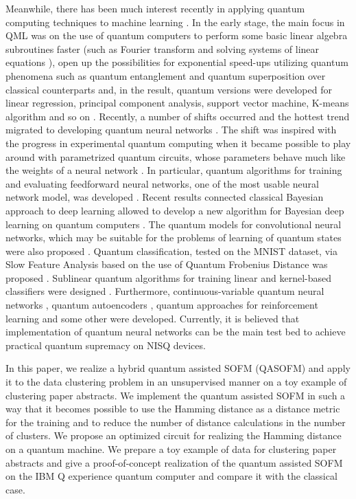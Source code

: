 \documentclass[pra,showkeys,twocolumn,showpacs]{revtex4-1}
\begin{document}
Meanwhile, there has been much interest recently in applying quantum computing techniques to machine learning \cite{dunjko2018, biamonte2017, schuld2014, carleo2019}. 
In the early stage, the main focus in QML was on the use of quantum computers to perform some basic linear algebra subroutines faster (such as Fourier transform and solving systems of linear equations \cite{wiebe2012,harrow2009,childs2017}), 
open up the possibilities for exponential speed-ups utilizing quantum phenomena such as quantum entanglement and quantum superposition over classical counterparts \cite{biamonte2017, schuld2014} and,
in the result, quantum versions were developed for linear regression, principal component analysis, support vector machine, K-means algorithm and so on \cite{lloyd2013,lloyd2014,dunjko2016,paparo2014,rebentrost2014}. 
Recently,  a number of shifts occurred and the hottest trend migrated to developing quantum neural networks \cite{kamruzzaman2019, schuld2014b, jeswal2019}. 
The shift was inspired with the progress in experimental quantum computing when it became possible to play around with parametrized quantum circuits, whose parameters behave much like the weights of a neural network \cite{lewenstein1994}. 
In particular, quantum algorithms for training and evaluating feedforward neural networks, one of the most usable neural network model, was developed \cite{allcock2018, tacchino2019}. 
Recent results connected classical Bayesian approach to deep learning allowed to develop a new algorithm for Bayesian deep learning on quantum computers \cite{zhao2019}. 
The quantum models for convolutional neural networks, which may be suitable for the problems of learning of quantum states were also proposed \cite{cong2019, liu2019}. Quantum classification, tested on the MNIST dataset, via Slow Feature Analysis based on the use of Quantum Frobenius Distance was proposed \cite{kerenidis2018}. 
Sublinear quantum algorithms for training linear and kernel-based classifiers were designed \cite{li2019}. 
Furthermore, continuous-variable quantum neural networks \cite{killoran2019}, quantum autoencoders \cite{bondarenko2019}, quantum approaches for reinforcement learning \cite{dunjko2017, nautrup2019, foesel2018} and some other \cite{rebentrost2018, purushothaman1997, verdon2019, cherny2019, byrnes2013, mishra2019, vinci2019, lu2019} were developed. 
Currently, it is believed that implementation of quantum neural networks can be the main test bed to achieve practical quantum supremacy on NISQ devices.

In this paper, we realize a hybrid quantum assisted SOFM (QASOFM) and apply it to the data clustering problem in an unsupervised manner on a toy example of clustering paper abstracts.   
We implement the quantum assisted SOFM in such a way that it becomes possible to use the Hamming distance as a distance metric for the training and to reduce the number of distance calculations in the number of clusters. 
We propose an optimized circuit for realizing the Hamming distance on a quantum machine. 
We prepare a toy example of data for clustering paper abstracts and give a proof-of-concept realization of the quantum assisted SOFM on the IBM Q experience quantum computer \cite{ibmq} and compare it with the classical case.
\end{document}
